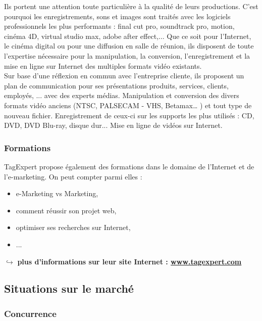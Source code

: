 \documentclass{article}
\begin{document}
\begin{sffamily}
Ils portent une attention toute particulière à la qualité de leurs productions. C’est pourquoi les enregistrements, sons et images sont traités avec les logiciels 
professionnels les plus performants : final cut pro, soundtrack pro, motion, cinéma 4D, virtual studio max, adobe after effect,...
Que ce soit pour l’Internet, le cinéma digital ou pour une diffusion en salle de réunion, ils disposent de toute l’expertise nécessaire pour la manipulation, la conversion, 
l’enregistrement et la mise en ligne sur Internet des multiples formats vidéo existants.\\

Sur base d’une réflexion en commun avec l'entreprise cliente, ils proposent un plan de communication pour ses présentations produits, services, clients, employés, ... avec 
des experts médias. Manipulation et conversion des divers formats vidéo anciens (NTSC, PALSECAM - VHS, Betamax… ) et tout type de nouveau fichier. Enregistrement de ceux-ci 
sur les supports les plus utilisés : CD, DVD, DVD Blu-ray, disque dur... Mise en ligne de vidéos sur Internet.

\subsubsection{Formations}

TagExpert propose également des formations dans le domaine de l'Internet et de l'e-marketing. On peut compter parmi elles :
\begin{itemize}
\item{e-Marketing vs Marketing},
\item{comment réussir son projet web},
\item{optimiser ses recherches sur Internet},
\item ...
\end{itemize}
\vspace*{1cm}
$\hookrightarrow$ \textbf{plus d'informations sur leur site Internet : \url{www.tagexpert.com}}

\newpage

\subsection{Situations sur le marché}

\subsubsection{Concurrence}


\end{sffamily}
\end{document}
